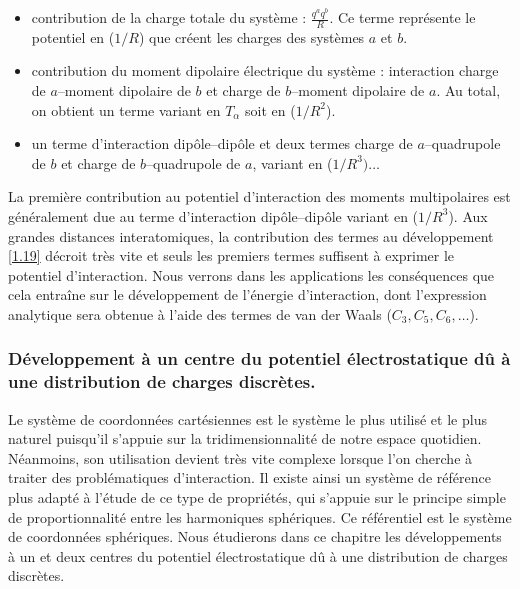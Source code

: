 	\begin{itemize}
		\item contribution de la charge totale du système : $\frac{q^{a}q^{b}}{R}$. Ce terme représente le potentiel en ($1/R$) que créent les charges des systèmes $a$ et $b$.
		\item contribution du moment dipolaire électrique du système : interaction charge de $a$--moment dipolaire de $b$ et charge de $b$--moment dipolaire de $a$. Au total, on obtient un terme variant en $T_{\alpha}$ soit en ($1/R^{2}$).	
		\item un terme d'interaction dipôle--dipôle et deux termes charge de $a$--quadrupole de $b$ et charge de $b$--quadrupole de $a$, variant en ($1/R^{3}) \ldots$
	\end{itemize}
	
	La première contribution au potentiel d'interaction des moments multipolaires est généralement due au terme d'interaction dipôle--dipôle variant en ($1/R^{3}$). Aux grandes distances interatomiques, la contribution des termes au développement \ref{1.19} décroit très vite et seuls les premiers termes suffisent à exprimer le potentiel d'interaction. Nous verrons dans les applications les conséquences que cela entraîne sur le développement de l'énergie d'interaction, dont l'expression analytique sera obtenue à l'aide des termes de van der Waals ($C_{3}, C_{5}, C_{6}, \ldots$).\\
	
	
	\subsubsection{Développement à un centre du potentiel électrostatique dû à une distribution de charges discrètes.}
	
	Le système de coordonnées cartésiennes est le système le plus utilisé et le plus naturel puisqu'il s'appuie sur la tridimensionnalité de notre espace quotidien. Néanmoins, son utilisation devient très vite complexe lorsque l'on cherche à traiter des problématiques d'interaction. Il existe ainsi un système de référence plus adapté à l'étude de ce type de propriétés, qui s'appuie sur le principe simple de proportionnalité entre les harmoniques sphériques. Ce référentiel est le système de coordonnées sphériques. Nous étudierons dans ce chapitre les développements à un et deux centres du potentiel électrostatique dû à une distribution de charges discrètes.\\
	
